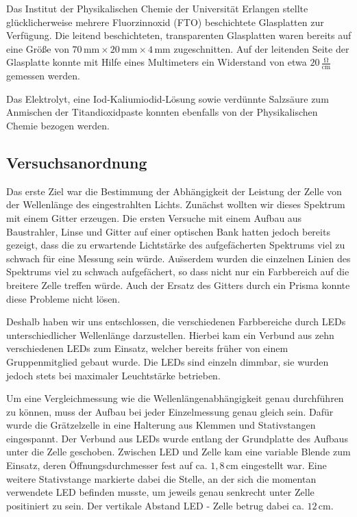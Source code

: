 \documentclass[11pt]{scrartcl}
\newcommand{\unit}[1]{\ensuremath{\,\mathrm{#1}}} %
\begin{document}
Das Institut der Physikalischen Chemie der Universit\"at Erlangen stellte gl\"ucklicherweise mehrere Fluorzinnoxid (FTO) beschichtete Glasplatten zur Verf\"ugung. Die leitend beschichteten, transparenten Glasplatten waren bereits auf eine Gr\"o\ss{}e von \(70\unit{mm} \times 20\unit{mm} \times 4 \unit{mm}\) zugeschnitten. Auf der leitenden Seite der Glasplatte konnte mit Hilfe eines Multimeters ein Widerstand von etwa \(20 \unit{\frac{\Omega}{cm}}\) gemessen werden.

Das Elektrolyt, eine Iod-Kaliumiodid-L\"osung sowie verd\"unnte Salzs\"aure zum Anmischen der Titandioxidpaste konnten ebenfalls von der Physikalischen Chemie bezogen werden.



\subsection{Versuchsanordnung} %
Das erste Ziel war die Bestimmung der Abh\"angigkeit der Leistung der Zelle von der Wellenl\"ange des eingestrahlten Lichts. Zun\"achst wollten wir dieses Spektrum mit einem Gitter erzeugen. Die ersten Versuche mit einem Aufbau aus Baustrahler, Linse und Gitter auf einer optischen Bank hatten jedoch bereits gezeigt, dass die zu erwartende Lichtst\"arke des aufgef\"acherten Spektrums viel zu schwach f\"ur eine Messung sein w\"urde. Au\"sserdem wurden die einzelnen Linien des Spektrums viel zu schwach aufgef\"achert, so dass nicht nur ein Farbbereich auf die breitere Zelle treffen w\"urde. Auch der Ersatz des Gitters durch ein Prisma konnte diese Probleme nicht l\"osen.

Deshalb haben wir uns entschlossen, die verschiedenen Farbbereiche durch LEDs unterschiedlicher Wellenl\"ange darzustellen. Hierbei kam ein Verbund aus zehn verschiedenen LEDs zum Einsatz, welcher bereits fr\"uher von einem Gruppenmitglied gebaut wurde.
Die LEDs sind einzeln dimmbar, sie wurden jedoch stets bei maximaler Leuchtst\"arke betrieben.

Um eine Vergleichmessung wie die Wellenl\"angenabh\"angigkeit genau durchf\"uhren zu k\"onnen, muss der Aufbau bei jeder Einzelmessung genau gleich sein. Daf\"ur wurde die Gr\"atzelzelle in eine Halterung aus Klemmen und Stativstangen eingespannt. Der Verbund aus LEDs wurde entlang der Grundplatte des Aufbaus unter die Zelle geschoben. Zwischen LED und Zelle kam eine variable Blende zum Einsatz, deren \"Offnungsdurchmesser fest auf ca. $1,8\unit{cm}$ eingestellt war. Eine weitere Stativstange markierte dabei die Stelle, an der sich die momentan verwendete LED befinden musste, um jeweils genau senkrecht unter Zelle positiniert zu sein. Der vertikale Abstand LED - Zelle betrug dabei ca. $12\unit{cm}$.
\end{document}
